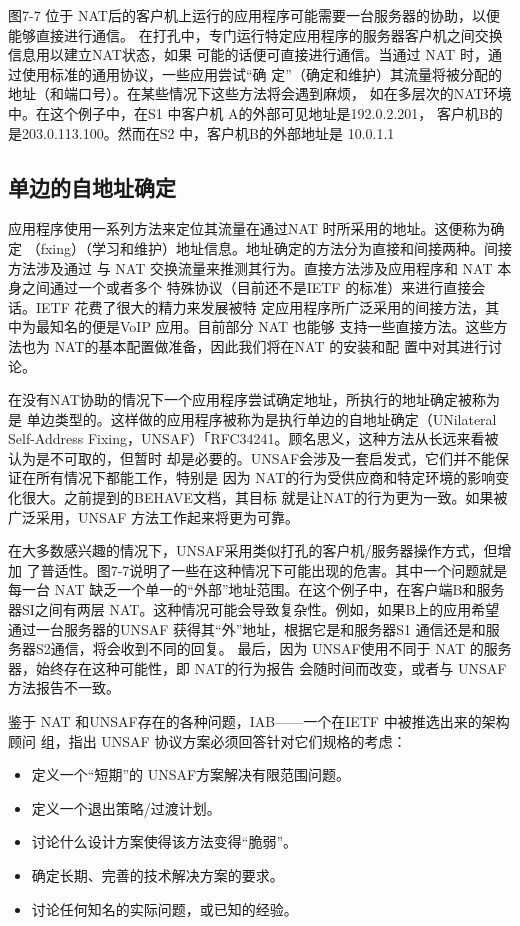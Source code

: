 图7-7
位于 NAT后的客户机上运行的应用程序可能需要一台服务器的协助，以便能够直接进行通信。
在打孔中，专门运行特定应用程序的服务器客户机之间交换信息用以建立NAT状态，如果
可能的话便可直接进行通信。当通过 NAT 时，通过使用标准的通用协议，一些应用尝试“确
定”（确定和维护）其流量将被分配的地址（和端口号）。在某些情况下这些方法将会遇到麻烦，
如在多层次的NAT环境中。在这个例子中，在S1 中客户机 A的外部可见地址是192.0.2.201，
客户机B的是203.0.113.100。然而在S2 中，客户机B的外部地址是 10.0.1.1

\subsection{单边的自地址确定}

应用程序使用一系列方法来定位其流量在通过NAT 时所采用的地址。这便称为确定
（fxing）（学习和维护）地址信息。地址确定的方法分为直接和间接两种。间接方法涉及通过
与 NAT 交换流量来推测其行为。直接方法涉及应用程序和 NAT 本身之间通过一个或者多个
特殊协议（目前还不是IETF 的标准）来进行直接会话。IETF 花费了很大的精力来发展被特
定应用程序所广泛采用的间接方法，其中为最知名的便是VoIP 应用。目前部分 NAT 也能够
支持一些直接方法。这些方法也为 NAT的基本配置做准备，因此我们将在NAT 的安装和配
置中对其进行讨论。

在没有NAT协助的情况下一个应用程序尝试确定地址，所执行的地址确定被称为是
单边类型的。这样做的应用程序被称为是执行单边的自地址确定（UNilateral Self-Address
Fixing，UNSAF）「RFC34241。顾名思义，这种方法从长远来看被认为是不可取的，但暂时
却是必要的。UNSAF会涉及一套启发式，它们并不能保证在所有情况下都能工作，特别是
因为 NAT的行为受供应商和特定环境的影响变化很大。之前提到的BEHAVE文档，其目标
就是让NAT的行为更为一致。如果被广泛采用，UNSAF 方法工作起来将更为可靠。

在大多数感兴趣的情况下，UNSAF采用类似打孔的客户机/服务器操作方式，但增加
了普适性。图7-7说明了一些在这种情况下可能出现的危害。其中一个问题就是每一台 NAT
缺乏一个单一的“外部”地址范围。在这个例子中，在客户端B和服务器SI之间有两层
NAT。这种情况可能会导致复杂性。例如，如果B上的应用希望通过一台服务器的UNSAF
获得其“外”地址，根据它是和服务器S1 通信还是和服务器S2通信，将会收到不同的回复。
最后，因为 UNSAF使用不同于 NAT 的服务器，始终存在这种可能性，即 NAT的行为报告
会随时间而改变，或者与 UNSAF 方法报告不一致。

鉴于 NAT 和UNSAF存在的各种问题，IAB——一个在IETF 中被推选出来的架构顾问
组，指出 UNSAF 协议方案必须回答针对它们规格的考虑：

\begin{itemize}
  \item 定义一个“短期”的 UNSAF方案解决有限范围问题。
  \item 定义一个退出策略/过渡计划。
  \item 讨论什么设计方案使得该方法变得“脆弱”。
  \item 确定长期、完善的技术解决方案的要求。
  \item 讨论任何知名的实际问题，或已知的经验。
\end{itemize}


